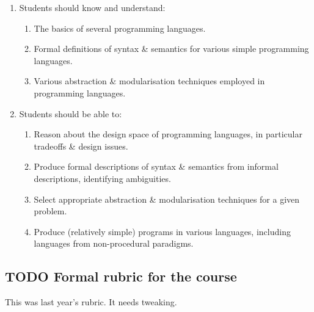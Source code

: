 \documentclass[11pt]{article}
\theoremstyle{definition}
\begin{document}
\begin{enumerate}
\item Students should know and understand:
\begin{enumerate}
\item The basics of several programming languages.
\item Formal definitions of syntax \& semantics for various
simple programming languages.
\item Various abstraction \& modularisation techniques
employed in programming languages.
\end{enumerate}
\item Students should be able to:
\begin{enumerate}
\item Reason about the design space of programming languages,
in particular tradeoffs \& design issues.
\item Produce formal descriptions of syntax \& semantics
from informal descriptions, identifying ambiguities.
\item Select appropriate abstraction \& modularisation techniques
for a given problem.
\item Produce (relatively simple) programs in various languages,
including languages from non-procedural paradigms.
\end{enumerate}
\end{enumerate}

\subsection{{\bfseries\sffamily TODO} Formal rubric for the course}
\label{sec:org5fc7b1d}

This was last year's rubric. It needs tweaking.
\end{document}
